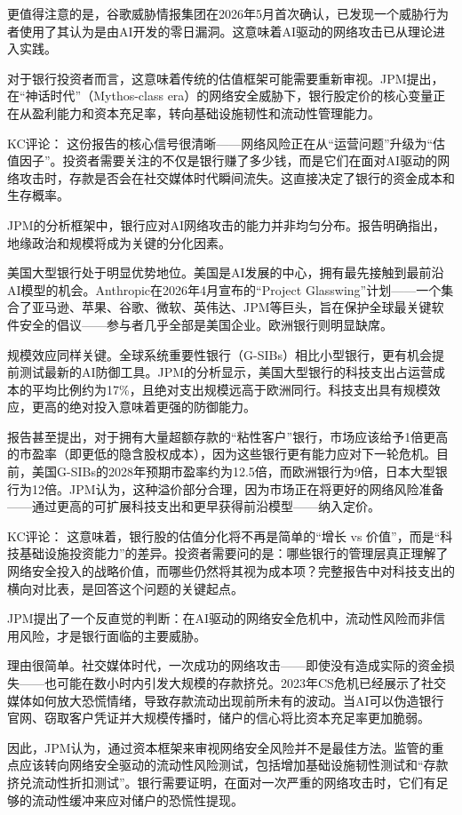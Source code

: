 \documentclass[11pt]{ctexart}
\begin{document}
更值得注意的是，谷歌威胁情报集团在2026年5月首次确认，已发现一个威胁行为者使用了其认为是由AI开发的零日漏洞。这意味着AI驱动的网络攻击已从理论进入实践。

对于银行投资者而言，这意味着传统的估值框架可能需要重新审视。JPM提出，在“神话时代”（Mythos-class era）的网络安全威胁下，银行股定价的核心变量正在从盈利能力和资本充足率，转向基础设施韧性和流动性管理能力。

KC评论： 这份报告的核心信号很清晰——网络风险正在从“运营问题”升级为“估值因子”。投资者需要关注的不仅是银行赚了多少钱，而是它们在面对AI驱动的网络攻击时，存款是否会在社交媒体时代瞬间流失。这直接决定了银行的资金成本和生存概率。

JPM的分析框架中，银行应对AI网络攻击的能力并非均匀分布。报告明确指出，地缘政治和规模将成为关键的分化因素。

美国大型银行处于明显优势地位。美国是AI发展的中心，拥有最先接触到最前沿AI模型的机会。Anthropic在2026年4月宣布的“Project Glasswing”计划——一个集合了亚马逊、苹果、谷歌、微软、英伟达、JPM等巨头，旨在保护全球最关键软件安全的倡议——参与者几乎全部是美国企业。欧洲银行则明显缺席。

规模效应同样关键。全球系统重要性银行（G-SIBs）相比小型银行，更有机会提前测试最新的AI防御工具。JPM的分析显示，美国大型银行的科技支出占运营成本的平均比例约为17\%，且绝对支出规模远高于欧洲同行。科技支出具有规模效应，更高的绝对投入意味着更强的防御能力。

报告甚至提出，对于拥有大量超额存款的“粘性客户”银行，市场应该给予1倍更高的市盈率（即更低的隐含股权成本），因为这些银行更有能力应对下一轮危机。目前，美国G-SIBs的2028年预期市盈率约为12.5倍，而欧洲银行为9倍，日本大型银行为12倍。JPM认为，这种溢价部分合理，因为市场正在将更好的网络风险准备——通过更高的可扩展科技支出和更早获得前沿模型——纳入定价。

KC评论： 这意味着，银行股的估值分化将不再是简单的“增长 vs 价值”，而是“科技基础设施投资能力”的差异。投资者需要问的是：哪些银行的管理层真正理解了网络安全投入的战略价值，而哪些仍然将其视为成本项？完整报告中对科技支出的横向对比表，是回答这个问题的关键起点。

JPM提出了一个反直觉的判断：在AI驱动的网络安全危机中，流动性风险而非信用风险，才是银行面临的主要威胁。

理由很简单。社交媒体时代，一次成功的网络攻击——即使没有造成实际的资金损失——也可能在数小时内引发大规模的存款挤兑。2023年CS危机已经展示了社交媒体如何放大恐慌情绪，导致存款流动出现前所未有的波动。当AI可以伪造银行官网、窃取客户凭证并大规模传播时，储户的信心将比资本充足率更加脆弱。

因此，JPM认为，通过资本框架来审视网络安全风险并不是最佳方法。监管的重点应该转向网络安全驱动的流动性风险测试，包括增加基础设施韧性测试和“存款挤兑流动性折扣测试”。银行需要证明，在面对一次严重的网络攻击时，它们有足够的流动性缓冲来应对储户的恐慌性提现。
\end{document}
